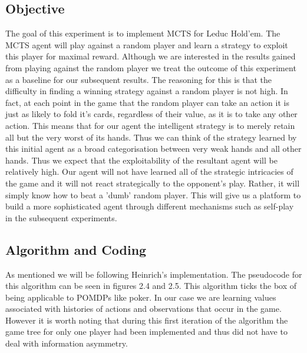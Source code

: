 \subsection{Objective}\label{subsec:objective1}
The goal of this experiment is to implement MCTS for Leduc Hold'em.
The MCTS agent will play against a random player and learn a strategy to exploit this player for
maximal reward.
Although we are interested in the results gained from playing against the random player we treat the
outcome of this experiment as a baseline for our subsequent results.
The reasoning for this is that the difficulty in finding a winning strategy against a random player
is not high.
In fact, at each point in the game that the random player can take an action it is
just as likely to fold it's cards, regardless of their value, as it is to take any other action.
This means that for our agent the intelligent strategy is to merely retain all but the
very worst of its hands.
Thus we can think of the strategy learned by this initial agent as a broad
categorisation between very weak hands and all other hands.
Thus we expect that the exploitability of the resultant agent will be relatively high.
Our agent will not have learned all of the strategic intricacies of the game
and it will not react strategically to the opponent's play.
Rather, it will simply know how to beat a 'dumb' random player.
This will give us a platform to build a more sophisticated agent through different mechanisms such as
self-play in the subsequent experiments.

\subsection{Algorithm and Coding}\label{subsec:algAndCoding1}
As mentioned we will be following Heinrich's implementation.
The pseudocode for this algorithm can be seen in figures 2.4 and 2.5.
This algorithm ticks the box of being applicable to POMDPs like poker.
In our case we are learning values associated with histories of actions and observations that occur in the game.
However it is worth noting that during this first iteration of the algorithm the game tree for only one player had
been implemented and thus did not have to deal with information asymmetry.

